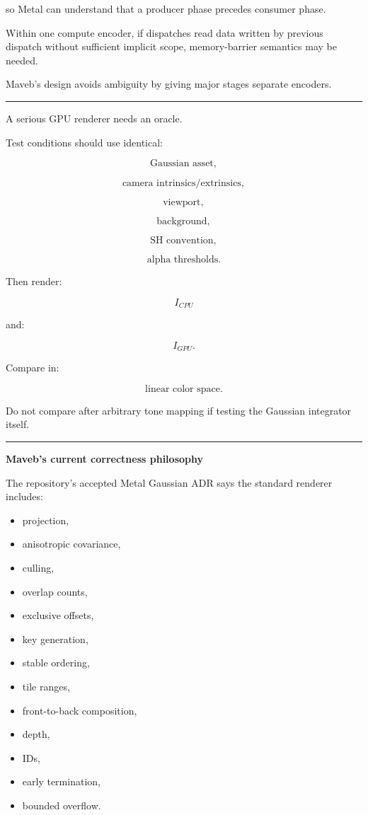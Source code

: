 so Metal can understand that a producer phase precedes consumer phase.

Within one compute encoder, if dispatches read data written by previous dispatch without sufficient implicit scope, memory-barrier semantics may be needed.

Maveb's design avoids ambiguity by giving major stages separate encoders.

\begin{center}\rule{0.5\linewidth}{0.5pt}\end{center}

A serious GPU renderer needs an oracle.

Test conditions should use identical:

\[
\text{Gaussian asset},
\]

\[
\text{camera intrinsics/extrinsics},
\]

\[
\text{viewport},
\]

\[
\text{background},
\]

\[
\text{SH convention},
\]

\[
\text{alpha thresholds}.
\]

Then render:

\[
I_{CPU}
\]

and:

\[
I_{GPU}.
\]

Compare in:

\[
\boxed{\text{linear color space}.}
\]

Do not compare after arbitrary tone mapping if testing the Gaussian integrator itself.

\begin{center}\rule{0.5\linewidth}{0.5pt}\end{center}

\textbf{Maveb's current correctness philosophy}

The repository's accepted Metal Gaussian ADR says the standard renderer includes:

\begin{itemize}
\tightlist
\item
  projection,
\item
  anisotropic covariance,
\item
  culling,
\item
  overlap counts,
\item
  exclusive offsets,
\item
  key generation,
\item
  stable ordering,
\item
  tile ranges,
\item
  front-to-back composition,
\item
  depth,
\item
  IDs,
\item
  early termination,
\item
  bounded overflow.
\end{itemize}

